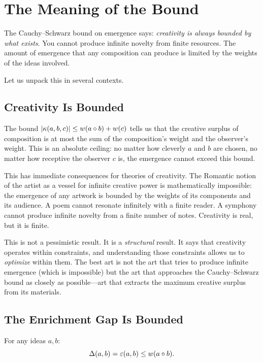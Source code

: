 \section{The Meaning of the Bound}

The Cauchy--Schwarz bound on emergence says: \emph{creativity is always bounded
by what exists}. You cannot produce infinite novelty from finite resources.
The amount of emergence that any composition can produce is limited by the
weights of the ideas involved.

Let us unpack this in several contexts.

\subsection{Creativity Is Bounded}

The bound $|\kappa(a,b,c)| \leq w(a \circ b) + w(c)$ tells us
that the creative surplus of composition is at most the sum of the composition's
weight and the observer's weight. This is an absolute ceiling: no matter how
cleverly $a$ and $b$ are chosen, no matter how receptive the observer $c$ is,
the emergence cannot exceed this bound.

\begin{interpretation}
This has immediate consequences for theories of creativity. The Romantic notion
of the artist as a vessel for infinite creative power is mathematically
impossible: the emergence of any artwork is bounded by the weights of its
components and its audience. A poem cannot resonate infinitely with a
finite reader. A symphony cannot produce infinite novelty from a finite
number of notes. Creativity is real, but it is finite.

This is not a pessimistic result. It is a \emph{structural} result. It says
that creativity operates within constraints, and understanding those constraints
allows us to \emph{optimize} within them. The best art is not the art that
tries to produce infinite emergence (which is impossible) but the art that
approaches the Cauchy--Schwarz bound as closely as possible---art that extracts
the maximum creative surplus from its materials.
\end{interpretation}

\subsection{The Enrichment Gap Is Bounded}

\begin{theorem}
\label{thm:enrichment-bound}
For any ideas $a, b$:
\[
  \Delta(a,b) = \varepsilon(a, b) \leq w(a \circ b).
\]
\end{theorem}

